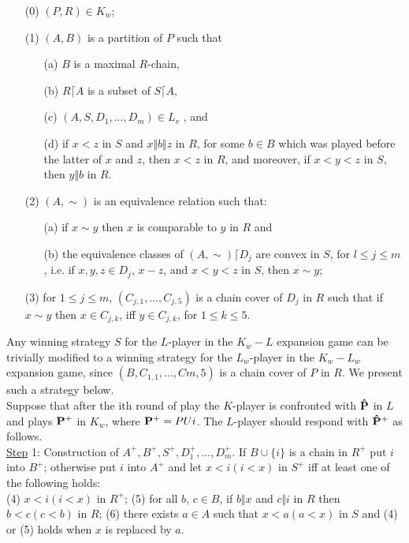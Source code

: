 \documentclass[twoside]{article}
\begin{document}
\begin{itemize}
  \item[(0)] $(P,R) \in K_w$;
  \item[(1)] $(A,B)$ is a partition of   $P$   such that
  \begin{itemize}
    \item[(a)] $B$   is a maximal $R$-chain,
    \item[(b)] $R\lceil A$   is a subset of   $S\lceil A$,
    \item[(c)] $(A,S,D_1,...,D_m) \in L_v$ , and
    \item[(d)] if   $x<z$   in   $S$   and   $x\Vert b\Vert z$   in   $R$, for some   $b\in B$ which was
played before the latter of   $x$   and   $z$,    then   $x<z$ in $R$, and moreover, if $x<y<z$   in $S$, then   $y\Vert b$   in $R$.
  \end{itemize}
  \item[(2)] 	$(A,\sim)$    is an equivalence relation such that:
%
%
  \begin{itemize}
    \item[(a)] if   $x\sim y$    then   $x$   is comparable to     $y$   in   $R$ and
    \item[(b)] the equivalence classes of $(A,\sim)\lceil D_j$    are convex in $S$, for
$l\leq j\leq m$,    i.e.    if   $x,y,z \in D_j$, $x-z$, and   $x<y<z$ in   $S$,    then   $x\sim y$;
   \end{itemize}
  \item[(3)] for    $1\leq j\leq m$,  $(C_{j,1},...,C_{j,5})$    is a chain cover of   $D_j$    in   $R$ such that if   $x\sim y$   then   $x\in C_{j,k}$,    iff   $y\in C_{j,k}$,   for $1\leq k\leq 5$.\\
\end{itemize}

Any winning strategy   $S$   for the $L$-player in the   $K_w-L$ expansion game can
be trivially modified to a winning strategy for the   $L_w$-player in the $K_w-L_w$ expansion game, since $(B,C_{1,1},...,C{m,5})$    is a chain cover of   $P$   in   $R$. We
present such a strategy below.\\
\indent Suppose that after the ith round of play the   $K$-player is confronted with $\mathbf{\hat{P}}$   in   $L$   and plays   $\mathbf{P^+}$   in $K_w$, where   $\mathbf{P^+} = P U {i}$.   The   $L$-player should respond with   $\mathbf{\hat{P}^+}$ as follows.\\
\newline
\underline{Step} 1: Construction of   $A^+,B^+,S^+,D_1^+,...,D_m^+$.    If   $B \cup \{i\}$    is a chain in $R^+$ put   $i$    into   $B^+$; otherwise put   $i$   into   $A^+$   and let   $x<i (i<x)$   in   $S^+$ iff at least one of the following holds:\\
\newline
(4) $x<i (i<x)$    in $R^+$;
(5) for all $b$, $c \in B$, if $b\Vert x$  and   $c\Vert i$   in   $R$   then   $b<c (c<b)$ in $R$;
(6) there exists   $a \in A$   such that   $x<a (a<x)$ in   $S$   and   (4)   or (5) holds when   $x$   is replaced by $a$.\\
\end{document}
